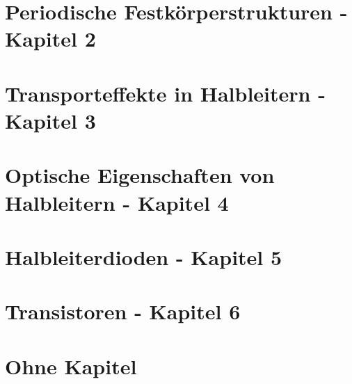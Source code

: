 \documentclass{article}
\begin{document}
\section{Periodische Festkörperstrukturen - Kapitel 2}


\section{Transporteffekte in Halbleitern - Kapitel 3}


\section{Optische Eigenschaften von Halbleitern - Kapitel 4}


\section{Halbleiterdioden - Kapitel 5}



\section{Transistoren - Kapitel 6}\label{k6:transistoren}

\section{Ohne Kapitel}
\end{document}
